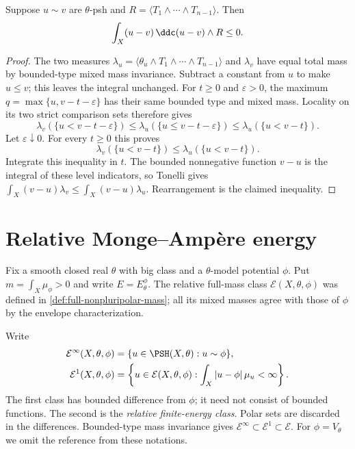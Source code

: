 \begin{lemma}\label{lem:bounded-difference-negative-hessian-energy}
Suppose $u\sim v$ are $\theta$-psh and $R=\langle T_1\wedge\cdots\wedge T_{n-1}\rangle$. Then
\[
 \int_X(u-v)\,\ddc(u-v)\wedge R\leq0.
\]
\end{lemma}
\begin{proof}
The two measures $\lambda_u=\langle\theta_u\wedge T_1\wedge\cdots\wedge T_{n-1}\rangle$ and $\lambda_v$ have equal total mass by bounded-type mixed mass invariance. Subtract a constant from $u$ to make $u\leq v$; this leaves the integral unchanged. For $t\geq0$ and $\varepsilon>0$, the maximum $q=\max\{u,v-t-\varepsilon\}$ has their same bounded type and mixed mass. Locality on its two strict comparison sets therefore gives
\[
 \lambda_v(\{u<v-t-\varepsilon\})
    \leq\lambda_u(\{u\leq v-t-\varepsilon\})
    \leq\lambda_u(\{u<v-t\}).
\]
Let $\varepsilon\downarrow0$. For every $t\geq0$ this proves
\[
 \lambda_v(\{u<v-t\})\leq\lambda_u(\{u<v-t\}).
\]
Integrate this inequality in $t$. The bounded nonnegative function $v-u$ is the integral of these level indicators, so Tonelli gives
$\int_X(v-u)\lambda_v\leq\int_X(v-u)\lambda_u$.
Rearrangement is the claimed inequality.
\end{proof}

\section{Relative Monge--Amp\`ere energy}
\label{sec:relative-monge-ampere-energy}
Fix a smooth closed real $\theta$ with big class and a $\theta$-model potential $\phi$. Put $m=\int_X\mu_\phi>0$ and write $E=E_\theta^\phi$. The relative full-mass class $\mathcal E(X,\theta,\phi)$ was defined in \cref{def:full-nonpluripolar-mass}; all its mixed masses agree with those of $\phi$ by the envelope characterization.

\begin{definition}\label{def:relative-bounded-and-finite-energy-classes}
Write
\[
 \begin{aligned}
 \mathcal E^\infty(X,\theta,\phi)
       &=\{u\in\PSH(X,\theta):u\sim\phi\},\\
 \mathcal E^1(X,\theta,\phi)
       &=\left\{u\in\mathcal E(X,\theta,\phi):
                         \int_X|u-\phi|\,\mu_u<\infty\right\}.
 \end{aligned}
\]
The first class has bounded difference from $\phi$; it need not consist of bounded functions. The second is the \emph{relative finite-energy class}. Polar sets are discarded in the differences. Bounded-type mass invariance gives
$\mathcal E^\infty\subset\mathcal E^1\subset\mathcal E$.
For $\phi=V_\theta$ we omit the reference from these notations.
\end{definition}


